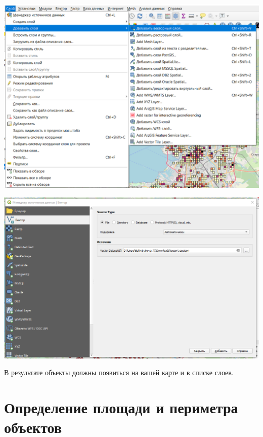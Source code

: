 \documentclass[
]{book}
\begin{document}
\includegraphics{figures/38.png}

\includegraphics{figures/39.png}

В результате объекты должны появиться на вашей карте и в списке слоев.

\hypertarget{ux43eux43fux440ux435ux434ux435ux43bux435ux43dux438ux435-ux43fux43bux43eux449ux430ux434ux438-ux438-ux43fux435ux440ux438ux43cux435ux442ux440ux430-ux43eux431ux44aux435ux43aux442ux43eux432}{%
\chapter{Определение площади и периметра объектов}\label{ux43eux43fux440ux435ux434ux435ux43bux435ux43dux438ux435-ux43fux43bux43eux449ux430ux434ux438-ux438-ux43fux435ux440ux438ux43cux435ux442ux440ux430-ux43eux431ux44aux435ux43aux442ux43eux432}}
\end{document}
